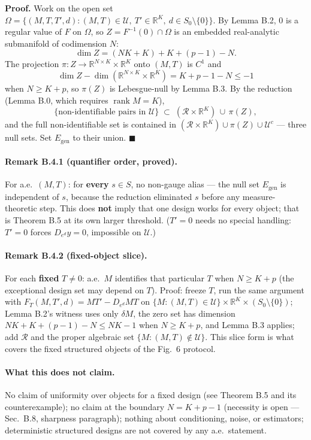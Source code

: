 \noindent\textbf{Proof.} Work on the open set $\Omega=\{(M,T,T',d):(M,T)\in\mathcal U,\ T'\in\mathbb R^K,\ d\in S_0\setminus\{0\}\}$. By Lemma B.2, $0$ is a regular value of $F$ on $\Omega$, so $Z=F^{-1}(0)\cap\Omega$ is an embedded real-analytic submanifold of codimension $N$:
\[
\dim Z=(NK+K)+K+(p-1)-N.
\]
The projection $\pi:Z\to\mathbb R^{N\times K}\times\mathbb R^K$ onto $(M,T)$ is $C^1$ and
\[
\dim Z-\dim(\mathbb R^{N\times K}\times\mathbb R^K)=K+p-1-N\le-1
\]
when $N\ge K+p$, so $\pi(Z)$ is Lebesgue-null by Lemma B.3. By the reduction (Lemma B.0, which requires $\operatorname{rank}M=K$),
\[
\{\text{non-identifiable pairs in }\mathcal U\}\;\subset\;(\mathcal R\times\mathbb R^K)\,\cup\,\pi(Z),
\]
and the full non-identifiable set is contained in $(\mathcal R\times\mathbb R^K)\cup\pi(Z)\cup\mathcal U^{c}$ --- three null sets. Set $E_{\mathrm{gen}}$ to their union. \hfill$\blacksquare$

\paragraph{Remark B.4.1 (quantifier order, proved).} For a.e.\ $(M,T)$: for \textbf{every} $s\in S$, no non-gauge alias --- the null set $E_{\mathrm{gen}}$ is independent of $s$, because the reduction eliminated $s$ before any measure-theoretic step. This does \textbf{not} imply that one design works for every object; that is Theorem B.5 at its own larger threshold. ($T'=0$ needs no special handling: $T'=0$ forces $D_{e^{d}}y=0$, impossible on $\mathcal U$.)

\paragraph{Remark B.4.2 (fixed-object slice).} For each \textbf{fixed} $T\neq0$: a.e.\ $M$ identifies that particular $T$ when $N\ge K+p$ (the exceptional design set may depend on $T$). Proof: freeze $T$, run the same argument with $F_T(M,T',d)=MT'-D_{e^{d}}MT$ on $\{M:(M,T)\in\mathcal U\}\times\mathbb R^K\times(S_0\setminus\{0\})$; Lemma B.2's witness uses only $\delta M$, the zero set has dimension $NK+K+(p-1)-N\le NK-1$ when $N\ge K+p$, and Lemma B.3 applies; add $\mathcal R$ and the proper algebraic set $\{M:(M,T)\notin\mathcal U\}$. This slice form is what covers the fixed structured objects of the Fig.~6 protocol.

\paragraph{What this does not claim.} No claim of uniformity over objects for a fixed design (see Theorem B.5 and its counterexample); no claim at the boundary $N=K+p-1$ (necessity is open --- Sec.~B.8, sharpness paragraph); nothing about conditioning, noise, or estimators; deterministic structured designs are not covered by any a.e.\ statement.

